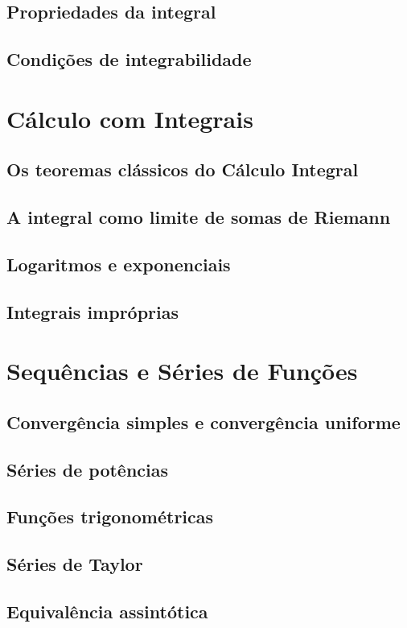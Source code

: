 \documentclass{article}
\begin{document}
\subsection{Propriedades da integral}
\subsection{Condições de integrabilidade}

\section{Cálculo com Integrais}
\subsection{Os teoremas clássicos do Cálculo Integral}
\subsection{A integral como limite de somas de Riemann}
\subsection{Logaritmos e exponenciais}
\subsection{Integrais impróprias}

\section{Sequências e Séries de Funções}
\subsection{Convergência simples e convergência uniforme}
\subsection{Séries de potências}
\subsection{Funções trigonométricas}
\subsection{Séries de Taylor}

\begin{appendix}

\section{Equivalência assintótica}

\end{appendix}
\end{document}
